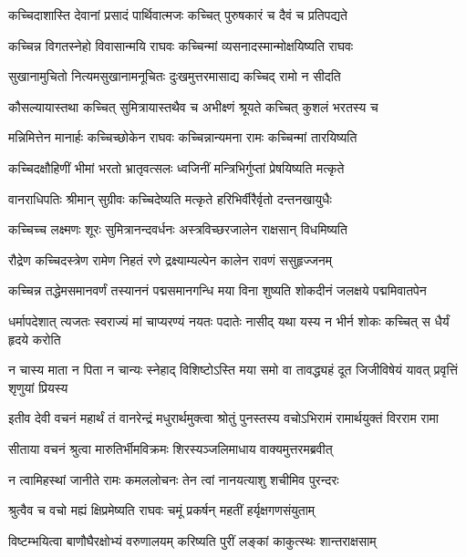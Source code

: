 \twolineshloka
{कच्चिदाशास्ति देवानां प्रसादं पार्थिवात्मजः}
{कच्चित् पुरुषकारं च दैवं च प्रतिपद्यते} %

\twolineshloka
{कच्चिन्न विगतस्नेहो विवासान्मयि राघवः}
{कच्चिन्मां व्यसनादस्मान्मोक्षयिष्यति राघवः} %

\twolineshloka
{सुखानामुचितो नित्यमसुखानामनूचितः}
{दुःखमुत्तरमासाद्य कच्चिद् रामो न सीदति} %

\twolineshloka
{कौसल्यायास्तथा कच्चित् सुमित्रायास्तथैव च}
{अभीक्ष्णं श्रूयते कच्चित् कुशलं भरतस्य च} %

\twolineshloka
{मन्निमित्तेन मानार्हः कच्चिच्छोकेन राघवः}
{कच्चिन्नान्यमना रामः कच्चिन्मां तारयिष्यति} %

\twolineshloka
{कच्चिदक्षौहिणीं भीमां भरतो भ्रातृवत्सलः}
{ध्वजिनीं मन्त्रिभिर्गुप्तां प्रेषयिष्यति मत्कृते} %

\twolineshloka
{वानराधिपतिः श्रीमान् सुग्रीवः कच्चिदेष्यति}
{मत्कृते हरिभिर्वीरैर्वृतो दन्तनखायुधैः} %

\twolineshloka
{कच्चिच्च लक्ष्मणः शूरः सुमित्रानन्दवर्धनः}
{अस्त्रविच्छरजालेन राक्षसान् विधमिष्यति} %

\twolineshloka
{रौद्रेण कच्चिदस्त्रेण रामेण निहतं रणे}
{द्रक्ष्याम्यल्पेन कालेन रावणं ससुहृज्जनम्} %

\twolineshloka
{कच्चिन्न तद्धेमसमानवर्णं तस्याननं पद्मसमानगन्धि}
{मया विना शुष्यति शोकदीनं जलक्षये पद्ममिवातपेन} %

\twolineshloka
{धर्मापदेशात् त्यजतः स्वराज्यं मां चाप्यरण्यं नयतः पदातेः}
{नासीद् यथा यस्य न भीर्न शोकः कच्चित् स धैर्यं हृदये करोति} %

\twolineshloka
{न चास्य माता न पिता न चान्यः स्नेहाद् विशिष्टोऽस्ति मया समो वा}
{तावद्ध्यहं दूत जिजीविषेयं यावत् प्रवृत्तिं शृणुयां प्रियस्य} %

\twolineshloka
{इतीव देवी वचनं महार्थं तं वानरेन्द्रं मधुरार्थमुक्त्वा}
{श्रोतुं पुनस्तस्य वचोऽभिरामं रामार्थयुक्तं विरराम रामा} %

\twolineshloka
{सीताया वचनं श्रुत्वा मारुतिर्भीमविक्रमः}
{शिरस्यञ्जलिमाधाय वाक्यमुत्तरमब्रवीत्} %

\twolineshloka
{न त्वामिहस्थां जानीते रामः कमललोचनः}
{तेन त्वां नानयत्याशु शचीमिव पुरन्दरः} %

\twolineshloka
{श्रुत्वैव च वचो मह्यं क्षिप्रमेष्यति राघवः}
{चमूं प्रकर्षन् महतीं हर्यृक्षगणसंयुताम्} %

\twolineshloka
{विष्टम्भयित्वा बाणौघैरक्षोभ्यं वरुणालयम्}
{करिष्यति पुरीं लङ्कां काकुत्स्थः शान्तराक्षसाम्} %

